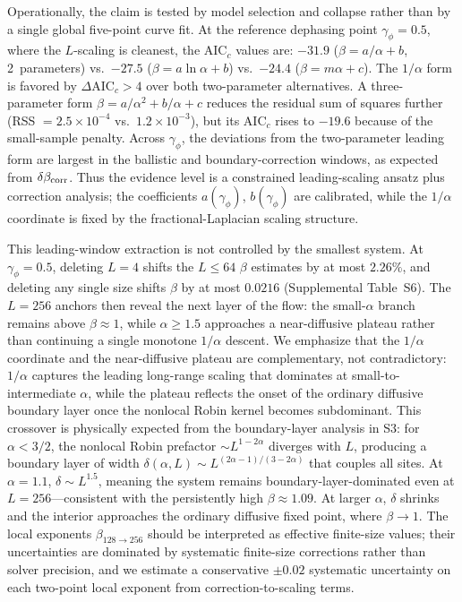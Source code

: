 \documentclass[aps,prd,twocolumn,superscriptaddress,floatfix]{revtex4-2}
\begin{document}
Operationally, the claim is tested by model selection and collapse
rather than by a single global five-point curve fit. At the reference
dephasing point $\gamma_\phi = 0.5$, where the $L$-scaling is
cleanest, the AIC$_c$ values are: $-31.9$ ($\beta = a/\alpha+b$,
2~parameters) vs.\ $-27.5$ ($\beta = a\ln\alpha + b$) vs.\ $-24.4$
($\beta = m\alpha + c$). The $1/\alpha$ form is favored by
$\Delta\text{AIC}_c > 4$ over both two-parameter alternatives. A
three-parameter form $\beta = a/\alpha^2 + b/\alpha + c$ reduces the
residual sum of squares further (RSS $= 2.5\times10^{-4}$
vs.\ $1.2\times10^{-3}$), but its AIC$_c$ rises to $-19.6$ because of
the small-sample penalty. Across $\gamma_\phi$, the deviations from
the two-parameter leading form are largest in the ballistic and
boundary-correction windows, as expected from $\delta\beta_{\rm
corr}$. Thus the evidence level is a constrained leading-scaling
ansatz plus correction analysis; the coefficients $a(\gamma_\phi)$,
$b(\gamma_\phi)$ are calibrated, while the $1/\alpha$ coordinate is
fixed by the fractional-Laplacian scaling structure.

This leading-window extraction is not controlled by the smallest
system. At $\gamma_\phi = 0.5$, deleting $L = 4$ shifts the $L\leq 64$
$\beta$ estimates by at most $2.26\%$, and deleting any single size
shifts $\beta$ by at most $0.0216$ (Supplemental Table~S6). The
$L=256$ anchors then reveal the next layer of the flow: the
small-$\alpha$ branch remains above $\beta \approx 1$, while
$\alpha \geq 1.5$ approaches a near-diffusive plateau rather than
continuing a single monotone $1/\alpha$ descent. We emphasize that the
$1/\alpha$ coordinate and the near-diffusive plateau are
complementary, not contradictory: $1/\alpha$ captures the leading
long-range scaling that dominates at small-to-intermediate $\alpha$,
while the plateau reflects the onset of the ordinary diffusive
boundary layer once the nonlocal Robin kernel becomes subdominant.
This crossover is physically expected from the boundary-layer analysis
in S3: for $\alpha < 3/2$, the nonlocal Robin prefactor
$\sim L^{1-2\alpha}$ diverges with $L$, producing a boundary layer of
width $\delta(\alpha,L) \sim L^{(2\alpha-1)/(3-2\alpha)}$ that couples
all sites. At $\alpha = 1.1$, $\delta \sim L^{1.5}$, meaning the
system remains boundary-layer-dominated even at $L=256$---consistent
with the persistently high $\beta \approx 1.09$. At larger $\alpha$,
$\delta$ shrinks and the interior approaches the ordinary diffusive
fixed point, where $\beta \to 1$. The local exponents
$\beta_{128\to256}$ should be interpreted as effective finite-size
values; their uncertainties are dominated by systematic finite-size
corrections rather than solver precision, and we estimate a
conservative $\pm0.02$ systematic uncertainty on each two-point local
exponent from correction-to-scaling terms.
\end{document}
